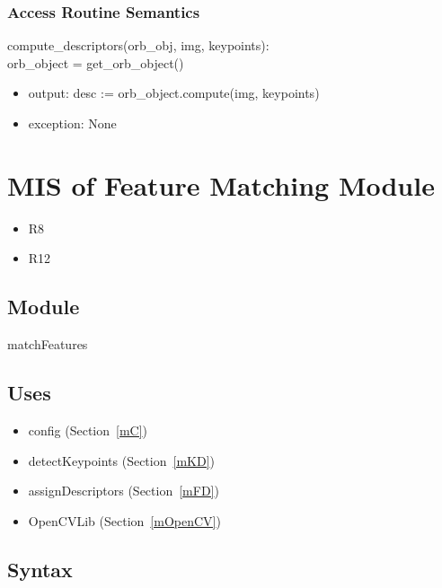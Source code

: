 \documentclass[12pt, titlepage]{article}
\begin{document}
\subsubsection{Access Routine Semantics}

\noindent compute\_descriptors(orb\_obj, img, keypoints):\\
orb\_object = get\_orb\_object()
\begin{itemize}
\item output: desc := orb\_object.compute(img, keypoints)
\item exception: None 
\end{itemize}




\section{MIS of Feature Matching Module} \label{mFM}
\begin{itemize}
  \item R8
  \item R12
\end{itemize}
\subsection{Module}

matchFeatures

\subsection{Uses}
\begin{itemize}
  \item config (Section~\ref{mC})
  \item detectKeypoints (Section~\ref{mKD})
  \item assignDescriptors (Section~\ref{mFD})
  \item OpenCVLib (Section~\ref{mOpenCV})
\end{itemize}

\subsection{Syntax}
\end{document}

